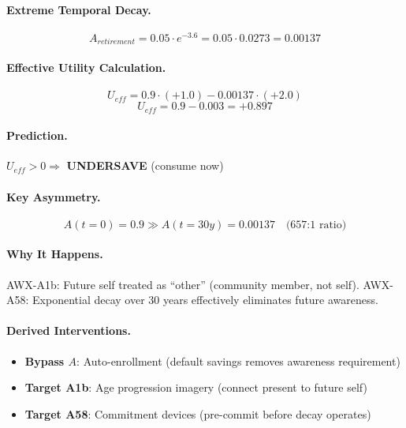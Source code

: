 \paragraph{Extreme Temporal Decay.}
\begin{equation}
A_{retirement} = 0.05 \cdot e^{-3.6} = 0.05 \cdot 0.0273 = 0.00137
\end{equation}

\paragraph{Effective Utility Calculation.}
\begin{equation}
U_{eff} = 0.9 \cdot (+1.0) - 0.00137 \cdot (+2.0)
\end{equation}
\begin{equation}
\boxed{U_{eff} = 0.9 - 0.003 = \mathbf{+0.897}}
\end{equation}

\paragraph{Prediction.}
$U_{eff} > 0 \Rightarrow$ \textbf{UNDERSAVE} (consume now)

\paragraph{Key Asymmetry.}
\begin{equation}
A(t=0) = 0.9 \gg A(t=30y) = 0.00137 \quad \text{(657:1 ratio)}
\end{equation}

\paragraph{Why It Happens.}
AWX-A1b: Future self treated as ``other'' (community member, not self). AWX-A58: Exponential decay over 30 years effectively eliminates future awareness.

\paragraph{Derived Interventions.}
\begin{itemize}
    \item \textbf{Bypass $A$}: Auto-enrollment (default savings removes awareness requirement)
    \item \textbf{Target A1b}: Age progression imagery (connect present to future self)
    \item \textbf{Target A58}: Commitment devices (pre-commit before decay operates)
\end{itemize}

